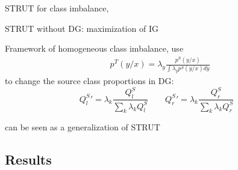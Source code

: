 \begin{frame}{STRUT for class imbalance}{\strutnd, \struthi}

    \begin{tcolorbox}[title=\strutnd,size=title,boxrule=0.2pt]
    STRUT without DG: maximization of IG
    \end{tcolorbox}
    \pause
    \begin{tcolorbox}[title=\struthi,size=title,boxrule=0.2pt]
    Framework of homogeneous class imbalance, use
    \begin{align*}
        & p^T(y/x) = \lambda_y \frac{p^S(y/x)}{\int{\lambda_y p^S(y/x)dy}}
    \end{align*}
    to change the source class proportions in DG:
    \begin{equation*}
    {Q_l^S} ' = \lambda_k\frac{ Q_l^S}{\sum \limits_{k}{ \lambda_{k}Q_l^S}} \quad \quad
    {Q_r^S} ' = \lambda_k\frac{ Q_r^S}{\sum \limits_{k}{ \lambda_{k}Q_r^S}} 
    \end{equation*}
    \end{tcolorbox}
    \pause
    \centering \textcolor{myorange}{\struthi} can be seen as a generalization of STRUT
 
\end{frame}

\subsection{Results}

